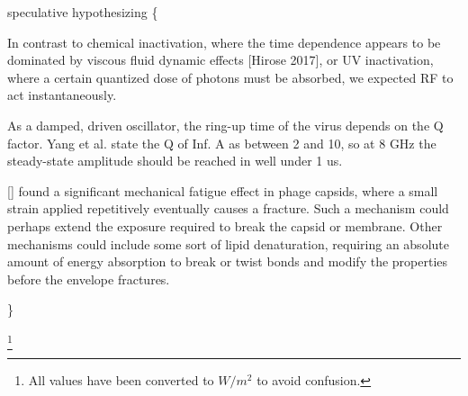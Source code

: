 \documentclass[fleqn,10pt]{article}
\begin{document}
{\color{red} speculative hypothesizing \{ } 

In contrast to chemical inactivation, where the time dependence appears to be dominated by viscous fluid dynamic effects [Hirose 2017], or UV inactivation, where a certain quantized dose of photons must be absorbed, we expected RF to act instantaneously.

As a damped, driven oscillator, the ring-up time of the virus depends on the Q factor. Yang et al. state the Q of Inf. A as between 2 and 10, so at 8 GHz the steady-state amplitude should be reached in well under 1 us. 

[] found a significant mechanical fatigue effect in phage capsids, where a small strain applied repetitively eventually causes a fracture. Such a mechanism could perhaps extend the exposure required to break the capsid or membrane. Other mechanisms could include some sort of lipid denaturation, requiring an absolute amount of energy absorption to break or twist bonds and modify the properties before the envelope fractures.


{\color{red}  \} } 

\footnote{All values have been converted to $W/m^2$ to avoid confusion.}
\end{document}
